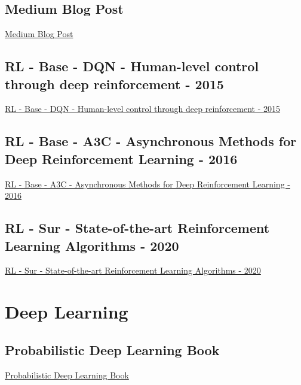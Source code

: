 \subsection{Medium Blog Post}
\href{https://medium.com/emergent-future/simple-reinforcement-learning-with-tensorflow-part-0-q-learning-with-tables-and-neural-networks-d195264329d0}{Medium Blog Post}

\subsection{RL - Base - DQN - Human-level control through deep reinforcement - 2015}
\href{https://www.nature.com/articles/nature14236}{RL - Base - DQN - Human-level control through deep reinforcement - 2015}

\subsection{RL - Base - A3C - Asynchronous Methods for Deep Reinforcement Learning - 2016}
\href{http://proceedings.mlr.press/v48/mniha16.html}{RL - Base - A3C - Asynchronous Methods for Deep Reinforcement Learning - 2016}

\subsection{RL - Sur - State-of-the-art Reinforcement Learning Algorithms - 2020}
\href{https://www.researchgate.net/publication/338396174_State-of-the-Art_Reinforcement_Learning_Algorithms}{RL - Sur - State-of-the-art Reinforcement Learning Algorithms - 2020}

\section{Deep Learning}
\subsection{Probabilistic Deep Learning Book}
\href{https://probml.github.io/pml-book/book1.html}{Probabilistic Deep Learning Book}
\\

